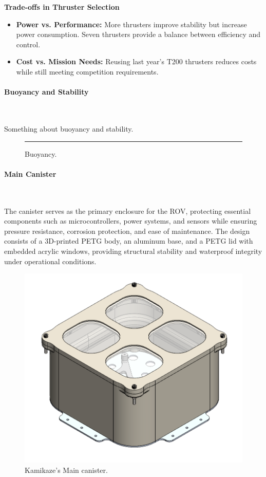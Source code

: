 \vspace{0.2cm}
\textbf{Trade-offs in Thruster Selection}
\vspace{-0.5\baselineskip}
\begin{itemize}
    \setlength{\itemsep}{0pt}
    \item \textbf{Power vs. Performance:} More thrusters improve stability but increase power consumption. Seven thrusters provide a balance between efficiency and control.
    \item \textbf{Cost vs. Mission Needs:} Reusing last year’s T200 thrusters reduces costs while still meeting competition requirements.
\end{itemize}

\vspace{-0.3cm}
\paragraph{Buoyancy and Stability} \ \\
\vspace{-0.5cm}

Something about buoyancy and stability. \lipsum[1]

\begin{figure}[h]
    \centering
    \rule{0.8\columnwidth}{4cm}
    \caption{Buoyancy.}
    \label{fig:buoyancy}
\end{figure}

\vspace{-0.3cm}
\paragraph{Main Canister} \ \\
\vspace{-0.5cm}

The canister serves as the primary enclosure for the ROV, protecting essential components such as microcontrollers, power systems, and sensors while ensuring pressure resistance, corrosion protection, and ease of maintenance. The design consists of a 3D-printed PETG body, an aluminum base, and a PETG lid with embedded acrylic windows, providing structural stability and waterproof integrity under operational conditions.

\begin{figure}[h]
    \centering
    \includegraphics[width=0.6\columnwidth]{Sections/2Design Rationale/images/canister.png}
    \caption{Kamikaze’s Main canister.}
    \label{fig:canister}
\end{figure}

